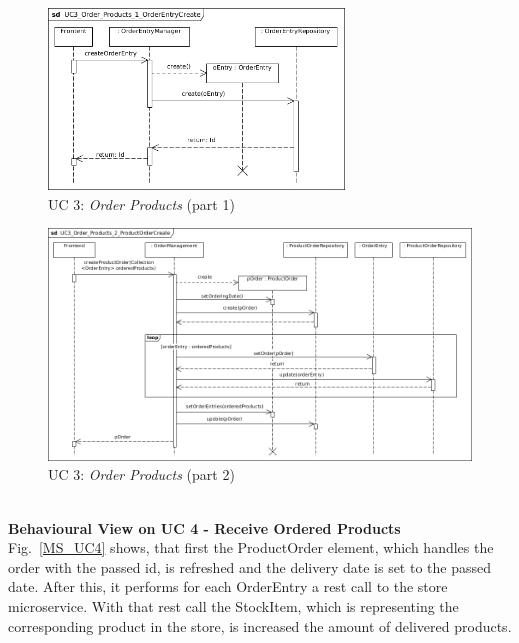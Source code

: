 		
			\begin{figure}[!h]
				\centering
				\includegraphics[width = 0.7\textwidth]{img/UC3_Order_Products_1_OrderEntryCreate.jpg}
				\caption{UC 3: \textit{Order Products} (part 1)}
				\label{MS_UC3_1}
			\end{figure}
			
			\begin{figure}[!h]
				\centering
				\includegraphics[width = 1\textwidth]{img/UC3_Order_Products_2_ProductOrderCreate.jpg}
				\caption{UC 3: \textit{Order Products} (part 2)}
				\label{MS_UC3_2}
			\end{figure}
		\noindent
		\\
		\textbf{Behavioural View on UC 4 - Receive Ordered Products} \\
		Fig.~\ref{MS_UC4} shows, that first the ProductOrder element, which handles the order with the passed id, is refreshed and the delivery date is set to the passed date.
		After this, it performs for each OrderEntry a rest call to the store microservice. With that rest call the StockItem, which is representing the corresponding product in the store, is increased the amount of delivered products.		
			
